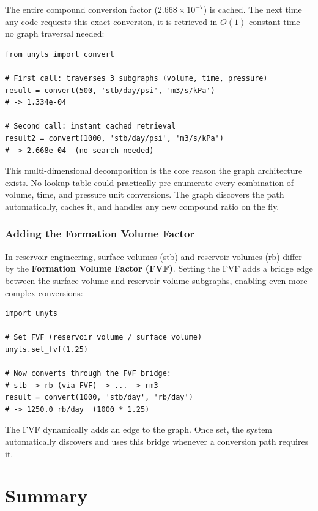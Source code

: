 \documentclass[11pt,a4paper]{report}
\begin{document}
The entire compound conversion factor ($2.668 \times 10^{-7}$) is cached. The next time any code requests this exact conversion, it is retrieved in $O(1)$ constant time---no graph traversal needed:

\begin{lstlisting}[style=pythonstyle]
from unyts import convert

# First call: traverses 3 subgraphs (volume, time, pressure)
result = convert(500, 'stb/day/psi', 'm3/s/kPa')
# -> 1.334e-04

# Second call: instant cached retrieval
result2 = convert(1000, 'stb/day/psi', 'm3/s/kPa')
# -> 2.668e-04  (no search needed)
\end{lstlisting}

This multi-dimensional decomposition is the core reason the graph architecture exists. No lookup table could practically pre-enumerate every combination of volume, time, and pressure unit conversions. The graph discovers the path automatically, caches it, and handles any new compound ratio on the fly.

\subsubsection{Adding the Formation Volume Factor}

In reservoir engineering, surface volumes (stb) and reservoir volumes (rb) differ by the \textbf{Formation Volume Factor (FVF)}. Setting the FVF adds a bridge edge between the surface-volume and reservoir-volume subgraphs, enabling even more complex conversions:

\begin{lstlisting}[style=pythonstyle]
import unyts

# Set FVF (reservoir volume / surface volume)
unyts.set_fvf(1.25)

# Now converts through the FVF bridge:
# stb -> rb (via FVF) -> ... -> rm3
result = convert(1000, 'stb/day', 'rb/day')
# -> 1250.0 rb/day  (1000 * 1.25)
\end{lstlisting}

The FVF dynamically adds an edge to the graph. Once set, the system automatically discovers and uses this bridge whenever a conversion path requires it.

\section{Summary}
\end{document}
